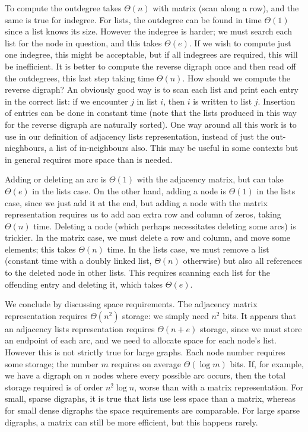 To compute the outdegree takes $\Theta(n)$ with matrix (scan along a
row), and the same is true for indegree. For lists, the outdegree can
be found in time $\Theta(1)$ since a list knows its size. However the
indegree is harder; we must search each list for the node in question,
and this takes $\Theta(e)$. If we wish to compute just one indegree,
this might be acceptable, but if all indegrees are required, this will be
inefficient. It is better to compute the reverse digraph once and then
read off the outdegrees, this last step taking time $\Theta(n)$. How
should we compute the reverse digraph? An obviously good way is to scan
each list and print each entry in the correct list: if we encounter $j$
in list $i$, then $i$ is written to list $j$. Insertion of entries can
be done in constant time (note that the lists produced in this way for
the reverse digraph are naturally sorted). One way around all this work
is to use in our definition of adjacency lists representation, instead
of just the out-nieghbours, a list of in-neighbours also. This may be
useful in some contexts but in general requires more space than is needed.

Adding or deleting an arc is $\Theta(1)$ with the adjacency matrix,
but can take $\Theta(e)$ in the lists case. On the other hand, adding a
node is $\Theta(1)$ in the lists case, since we just add it at the end,
but adding a node with the matrix representation requires us to add aan
extra row and column of zeros, taking $\Theta(n)$ time. Deleting a node
(which perhaps necessitates deleting some arcs) is trickier. In the
matrix case, we must delete a row and column, and move some elements;
this takes $\Theta(n)$ time. In the lists case, we must remove a list
(constant time with a doubly linked list, $\Theta(n)$ otherwise) but
also all references to the deleted node in other lists. This requires
scanning each list for the offending entry and deleting it, which takes
$\Theta(e)$.

We conclude by discussing space requirements. The adjacency matrix
representation requires $\Theta(n^2)$ storage: we simply need $n^2$
bits. It appears that an adjacency lists representation requires
$\Theta(n+e)$ storage, since we must store an endpoint of each arc,
and we need to allocate space for each node's list. However this is
not strictly true for large graphs. Each node number requires some
storage; the number $m$ requires on average  $\Theta(\log m)$ bits. If,
for example, we have a digraph on $n$ nodes where every possible arc
occurs, then the total storage required is of order $n^2 \log n$,
worse than with a matrix representation. For small, sparse digraphs,
it is true that lists use less space than a matrix, whereas for small
dense digraphs the space requirements are comparable. For large sparse
digraphs, a matrix can still be more efficient, but this happens rarely.

